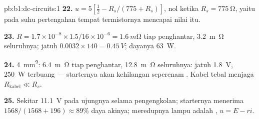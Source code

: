 \begin{solution}{pb:b1:dc-circuits:1}
\textbf{22.} $u = 5[\tfrac12 - R_s/(775 + R_s)]$, nol ketika $R_s =
\qty{775}{\ohm}$, yaitu pada suhu pertengahan tempat termistornya
mencapai nilai itu.

\textbf{23.} $R = 1.7\times10^{-8} \times 1.5/16\times10^{-6} =
\qty{1.6}{m\ohm}$ tiap penghantar, \qty{3.2}{m\ohm} seluruhnya; jatuh  $0.0032
\times 140 = \qty{0.45}{V}$; dayanya \qty{63}{W}.

\textbf{24.} \qty{4}{mm^2}: \qty{6.4}{m\ohm} tiap penghantar, \qty{12.8}{m\ohm}
seluruhnya: jatuh  \qty{1.8}{V}, \qty{250}{W} terbuang --- starternya
akan kehilangan seperenam . Kabel tebal menjaga $R_{\text{kabel}} \ll R_s$.

\textbf{25.} Sekitar \qty{11.1}{V} pada ujungnya selama pengengkolan;
starternya menerima $1568/(1568 + 196) \approx 89\%$ daya akinya;
meredupnya lampu adalah , $u = E - ri$.
\end{solution}
